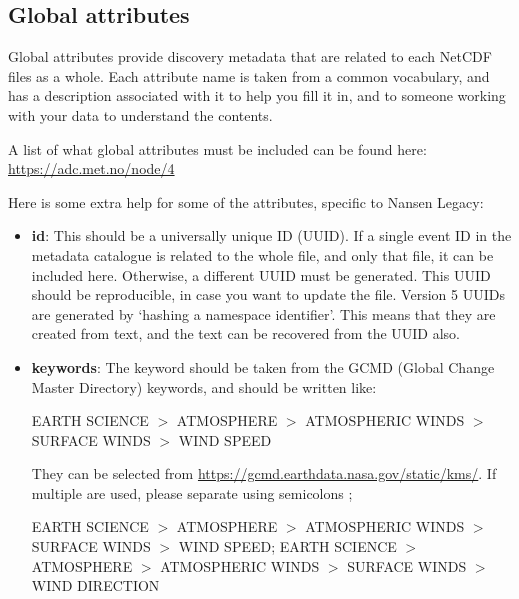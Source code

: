 \documentclass[a4paper,english, 11pt]{article}
\begin{document}
\subsection{Global attributes}
\label{ss:globalattributes}

Global attributes provide discovery metadata that are related to each NetCDF files as a whole. Each attribute name is taken from a common vocabulary, and has a description associated with it to help you fill it in, and to someone working with your data to understand the contents.

A list of what global attributes must be included can be found here:
\href{https://adc.met.no/node/4}{https://adc.met.no/node/4}

Here is some extra help for some of the attributes, specific to Nansen Legacy:
\begin{itemize}
\item \textbf{id}: This should be a universally unique ID (UUID). If a single event ID in the metadata catalogue is related to the whole file, and only that file, it can be included here. Otherwise, a different UUID must be generated. This UUID should be reproducible, in case you want to update the file. Version 5 UUIDs are generated by `hashing a namespace identifier'. This means that they are created from text, and the text can be recovered from the UUID also.
\item \textbf{keywords}: The keyword should be taken from the GCMD (Global Change Master Directory) keywords, and should be written like:

EARTH SCIENCE $>$ ATMOSPHERE $>$ ATMOSPHERIC WINDS $>$ SURFACE WINDS $>$  WIND SPEED

They can be selected from \url{https://gcmd.earthdata.nasa.gov/static/kms/}.
If multiple are used, please separate using semicolons ;

EARTH SCIENCE $>$ ATMOSPHERE $>$ ATMOSPHERIC WINDS $>$ SURFACE WINDS $>$  WIND SPEED; EARTH SCIENCE $>$ ATMOSPHERE $>$ ATMOSPHERIC WINDS $>$ SURFACE WINDS $>$  WIND DIRECTION


\end{itemize}
\end{document}
